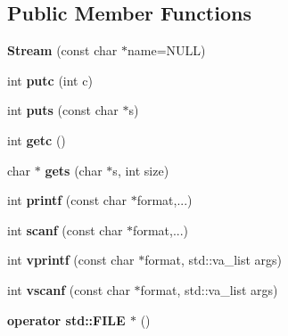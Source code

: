 \subsection*{Public Member Functions}
\begin{DoxyCompactItemize}
\item 
{\bfseries Stream} (const char $\ast$name=N\+U\+LL)\hypertarget{classmbed_1_1_stream_a32d590dce747212c986b9c8fa8f626f8}{}\label{classmbed_1_1_stream_a32d590dce747212c986b9c8fa8f626f8}

\item 
int {\bfseries putc} (int c)\hypertarget{classmbed_1_1_stream_ae948b0f3eaf7736ca0f6a1648e9390d6}{}\label{classmbed_1_1_stream_ae948b0f3eaf7736ca0f6a1648e9390d6}

\item 
int {\bfseries puts} (const char $\ast$s)\hypertarget{classmbed_1_1_stream_aaf7d4a2bb6c38f35d369f51cb2e3ba36}{}\label{classmbed_1_1_stream_aaf7d4a2bb6c38f35d369f51cb2e3ba36}

\item 
int {\bfseries getc} ()\hypertarget{classmbed_1_1_stream_a6167659331a6d841b0f766c4db1333e5}{}\label{classmbed_1_1_stream_a6167659331a6d841b0f766c4db1333e5}

\item 
char $\ast$ {\bfseries gets} (char $\ast$s, int size)\hypertarget{classmbed_1_1_stream_ab5157ace501d836fba9fd3f40b8865d1}{}\label{classmbed_1_1_stream_ab5157ace501d836fba9fd3f40b8865d1}

\item 
int {\bfseries printf} (const char $\ast$format,...)\hypertarget{classmbed_1_1_stream_adca0a93ea6add55996848e0f4e148533}{}\label{classmbed_1_1_stream_adca0a93ea6add55996848e0f4e148533}

\item 
int {\bfseries scanf} (const char $\ast$format,...)\hypertarget{classmbed_1_1_stream_a07d45029be0f9cab42572f717d3d6e09}{}\label{classmbed_1_1_stream_a07d45029be0f9cab42572f717d3d6e09}

\item 
int {\bfseries vprintf} (const char $\ast$format, std\+::va\+\_\+list args)\hypertarget{classmbed_1_1_stream_a8eb2f574cd3dcee5064392b88367d0d7}{}\label{classmbed_1_1_stream_a8eb2f574cd3dcee5064392b88367d0d7}

\item 
int {\bfseries vscanf} (const char $\ast$format, std\+::va\+\_\+list args)\hypertarget{classmbed_1_1_stream_ae15610f53c542f3555c4614001c2c2f8}{}\label{classmbed_1_1_stream_ae15610f53c542f3555c4614001c2c2f8}

\item 
{\bfseries operator std\+::\+F\+I\+L\+E $\ast$} ()\hypertarget{classmbed_1_1_stream_ac18fba9194addd424fe10b7f7cb6376d}{}\label{classmbed_1_1_stream_ac18fba9194addd424fe10b7f7cb6376d}

\end{DoxyCompactItemize}
